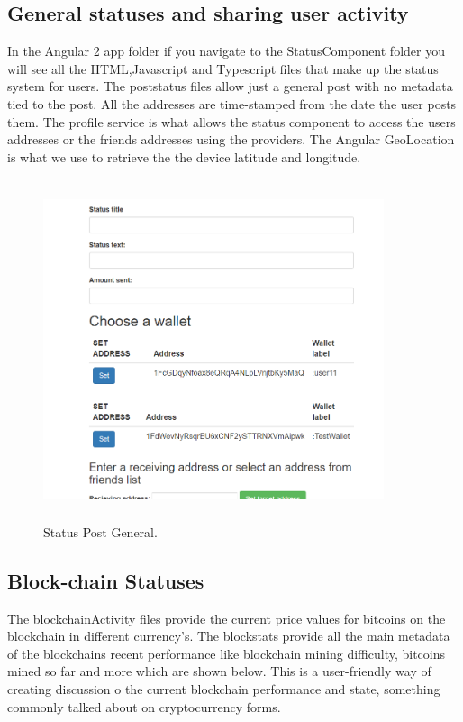 \subsection{General statuses and sharing user activity}
In the Angular 2 app folder if you navigate to the StatusComponent folder you will see all the HTML,Javascript and Typescript files that make up the status system for users. The poststatus files allow just a general post with no metadata tied to the post. All the addresses are time-stamped from the date the user posts them. The profile service is what allows the status component to access the users addresses or the friends addresses using the providers. The Angular GeoLocation is what we use to retrieve the the device latitude and longitude.

\begin{figure}[H]
\centering
\includegraphics[width=10cm, height=10cm]{img/post1.png}
\caption{Status Post General.}
\end{figure}


\subsection{Block-chain Statuses}
The blockchainActivity files provide the current price values for bitcoins on the blockchain in different currency's. The blockstats provide all the main metadata of the blockchains recent performance like blockchain mining difficulty, bitcoins mined so far and more which are shown below. This is a user-friendly way of creating discussion o the current blockchain performance and state, something commonly talked about on cryptocurrency forms.

